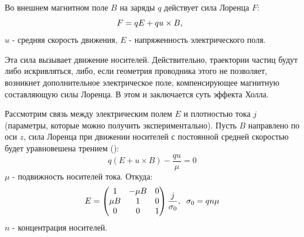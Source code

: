 \documentclass[a4paper,12pt]{article} %
\begin{document}
Во внешнем магнитном поле $B$ на заряды $q$ действует сила Лоренца $F$:
\begin{equation}
F = qE+qu\times B,  \hspace{2mm}
\end{equation}
 $u$ - средняя скорость движения, $E$ - напряженность электрического поля.
 
Эта сила вызывает движение носителей. Действительно, траектории частиц будут либо искривляться, либо, если геометрия проводника этого не позволяет,
возникнет дополнительное электрическое поле, компенсирующее магнитную
составляющую силы Лоренца. В этом и заключается суть эффекта Холла. 

Рассмотрим связь между электрическим полем $E$ и плотностью тока $j$ (параметры, которые можно получить экспериментально). Пусть $B$ направлено по оси $z$, сила Лоренца при движении носителей с постоянной средней скоростью будет уравновешена трением (\cite{labnik}):
\begin{equation}
q(E+u\times B)-\frac{qu}{\mu}=0
\end{equation}
$\mu$ - подвижность носителей тока.
Откуда:
\begin{equation}
\label{mu}
E = 
 \begin{pmatrix}
 1 & -\mu B & 0\\
 \mu B & 1 & 0\\
 0 & 0 & 1\\
 \end{pmatrix}
 \frac{j}{\sigma_0}, \hspace{2mm} \sigma_0 = qn\mu
\end{equation}
$n$ - концентрация носителей.
\end{document}
